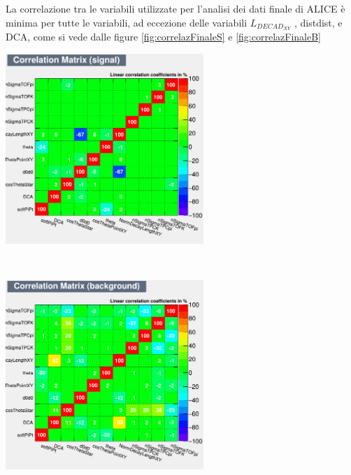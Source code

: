     La correlazione tra le variabili utilizzate per l'analisi dei dati finale di ALICE è minima per tutte le variabili, ad eccezione delle variabili $L_{{DECAD}_{XY}}$ , distdist, e DCA, come si vede dalle figure \ref{fig:correlazFinaleS} e \ref{fig:correlazFinaleB}
   
      \begin{minipage}{.5\textwidth}%
        \begin{flushleft} \large
        \flushleft
        \includegraphics[width=7.5cm]{training&testing/CorrelationMatrixS.png}
        \label{fig:correlazFinaleS}
        \end{flushleft}
        \end{minipage}
    ~
    \begin{minipage}{0.5\textwidth}
        \begin{flushright} \large
        \includegraphics[width=7.5cm]{training&testing/CorrelationMatrixB.png}
        \label{fig:correlazFinaleB}
        \end{flushright}
    \end{minipage} \\[1.cm]
    
